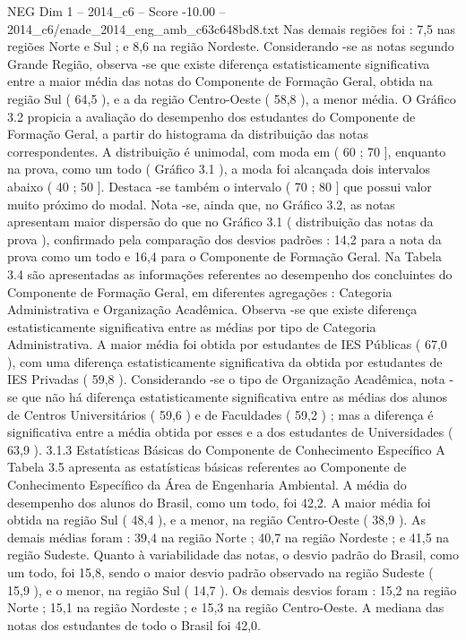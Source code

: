 \begin{textsample}{NEG Dim 1 – 2014\_c6 – Score -10.00 – 2014\_c6/enade\_2014\_eng\_amb\_c63c648bd8.txt}
Nas demais regiões foi : 7,5 nas regiões Norte e Sul ; e 8,6 na região Nordeste.
Considerando -se as notas segundo Grande Região, observa -se que existe diferença estatisticamente significativa entre a maior média das notas do Componente de Formação Geral, obtida na região Sul ( 64,5 ), e a da região Centro-Oeste ( 58,8 ), a menor média.
O Gráfico 3.2 propicia a avaliação do desempenho dos estudantes do Componente de Formação Geral, a partir do histograma da distribuição das notas correspondentes.
A distribuição é unimodal, com moda em ( 60 ; 70 ], enquanto na prova, como um todo ( Gráfico 3.1 ), a moda foi alcançada dois intervalos abaixo ( 40 ; 50 ].
Destaca -se também o intervalo ( 70 ; 80 ] que possui valor muito próximo do modal.
Nota -se, ainda que, no Gráfico 3.2, as notas apresentam maior dispersão do que no Gráfico 3.1 ( distribuição das notas da prova ), confirmado pela comparação dos desvios padrões : 14,2 para a nota da prova como um todo e 16,4 para o Componente de Formação Geral.
Na Tabela 3.4 são apresentadas as informações referentes ao desempenho dos concluintes do Componente de Formação Geral, em diferentes agregações : Categoria Administrativa e Organização Acadêmica.
Observa -se que existe diferença estatisticamente significativa entre as médias por tipo de Categoria Administrativa.
A maior média foi obtida por estudantes de IES Públicas ( 67,0 ), com uma diferença estatisticamente significativa da obtida por estudantes de IES Privadas ( 59,8 ).
Considerando -se o tipo de Organização Acadêmica, nota -se que não há diferença estatisticamente significativa entre as médias dos alunos de Centros Universitários ( 59,6 ) e de Faculdades ( 59,2 ) ; mas a diferença é significativa entre a média obtida por esses e a dos estudantes de Universidades ( 63,9 ). 3.1.3 Estatísticas Básicas do Componente de Conhecimento Específico A Tabela 3.5 apresenta as estatísticas básicas referentes ao Componente de Conhecimento Específico da Área de Engenharia Ambiental.
A média do desempenho dos alunos do Brasil, como um todo, foi 42,2.
A maior média foi obtida na região Sul ( 48,4 ), e a menor, na região Centro-Oeste ( 38,9 ).
As demais médias foram : 39,4 na região Norte ; 40,7 na região Nordeste ; e 41,5 na região Sudeste.
Quanto à variabilidade das notas, o desvio padrão do Brasil, como um todo, foi 15,8, sendo o maior desvio padrão observado na região Sudeste ( 15,9 ), e o menor, na região Sul ( 14,7 ).
Os demais desvios foram : 15,2 na região Norte ; 15,1 na região Nordeste ; e 15,3 na região Centro-Oeste.
A mediana das notas dos estudantes de todo o Brasil foi 42,0.

\end{textsample}
